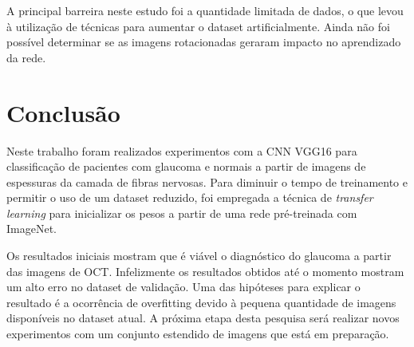 \documentclass[conference]{IEEEtran}
\begin{document}
A principal barreira neste estudo foi a quantidade limitada de dados, o que levou à utilização de técnicas para aumentar o dataset artificialmente. Ainda não foi possível determinar se as imagens rotacionadas geraram impacto no aprendizado da rede. 


\section{Conclusão}

Neste trabalho foram realizados experimentos com a CNN VGG16 para classificação de pacientes com glaucoma e normais a partir de imagens de espessuras da camada de fibras nervosas. Para diminuir o tempo de treinamento e permitir o uso de um dataset reduzido, foi empregada a técnica de \textit{transfer learning} para inicializar os pesos a partir de uma rede pré-treinada com ImageNet.

Os resultados iniciais mostram que é viável o diagnóstico do glaucoma a partir das imagens de OCT. Infelizmente os resultados obtidos até o momento mostram um alto erro no dataset de validação. Uma das hipóteses para explicar o resultado é a ocorrência de overfitting devido à pequena quantidade de imagens disponíveis no dataset atual. A próxima etapa desta pesquisa será realizar novos experimentos com um conjunto estendido de imagens que está em preparação.




\end{document}
